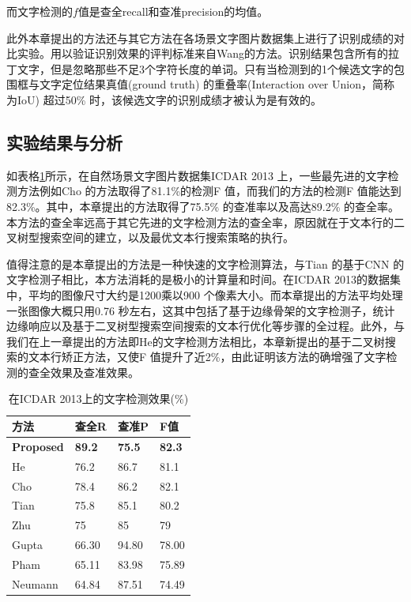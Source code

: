         而文字检测的$f$值是查全recall和查准precision的均值。

        此外本章提出的方法还与其它方法在各场景文字图片数据集上进行了识别成绩的对比实验。用以验证识别效果的评判标准来自Wang\cite{Wang2012End}的方法。识别结果包含所有的拉丁文字，但是忽略那些不足3个字符长度的单词。只有当检测到的1个候选文字的包围框与文字定位结果真值(ground truth) 的重叠率(Interaction over Union，简称为IoU) 超过50\% 时，该候选文字的识别成绩才被认为是有效的。

        \subsection{实验结果与分析}

        如表格\ref{tab.c4_icdar13}所示，在自然场景文字图片数据集ICDAR 2013 上，一些最先进的文字检测方法例如Cho\cite{Cho2016Canny} 的方法取得了81.1\%的检测F 值，而我们的方法的检测F 值能达到82.3\%。其中，本章提出的方法取得了75.5\% 的查准率以及高达89.2\% 的查全率。本方法的查全率远高于其它先进的文字检测方法的查全率，原因就在于文本行的二叉树型搜索空间的建立，以及最优文本行搜索策略的执行。

        值得注意的是本章提出的方法是一种快速的文字检测算法，与Tian\cite{Tian2016Text} 的基于CNN 的文字检测子相比，本方法消耗的是极小的计算量和时间。在ICDAR 2013的数据集中，平均的图像尺寸大约是1200乘以900 个像素大小。而本章提出的方法平均处理一张图像大概只用0.76 秒左右，这其中包括了基于边缘骨架的文字检测子，统计边缘响应以及基于二叉树型搜索空间搜索的文本行优化等步骤的全过程。此外，与我们在上一章提出的方法即He\cite{He2017scene}的文字检测方法相比，本章新提出的基于二叉树搜索的文本行矫正方法，又使F 值提升了近2\%，由此证明该方法的确增强了文字检测的查全效果及查准效果。

        \begin{table}[!h]
        \centering
        \caption{在ICDAR 2013上的文字检测效果(\%)}
        \begin{tabular}{p{}|p{} p{} p{}}
        \hline
        方法 & 查全R & 查准P & F值 \\
        \hline
        \textbf{Proposed} & \textbf{89.2} & \textbf{75.5} & \textbf{82.3}\\
        He\cite{He2017scene} & 76.2 & 86.7 & 81.1 \\
        Cho\cite{Cho2016Canny} & 78.4 & 86.2 & 82.1 \\
        Tian\cite{Tian2016Text} & 75.8 & 85.1 & 80.2 \\
        Zhu\cite{Zhu2016Text} & 75 & 85 & 79 \\
        Gupta\cite{Gupta2016Synthetic} & 66.30 & 94.80 & 78.00 \\
        Pham\cite{Pham2016Robust} & 65.11 & 83.98 & 75.89 \\
        Neumann\cite{Neumann2012Real} & 64.84 & 87.51 & 74.49 \\
        \hline
        \end{tabular}
        \label{tab.c4_icdar13}
        \end{table}

